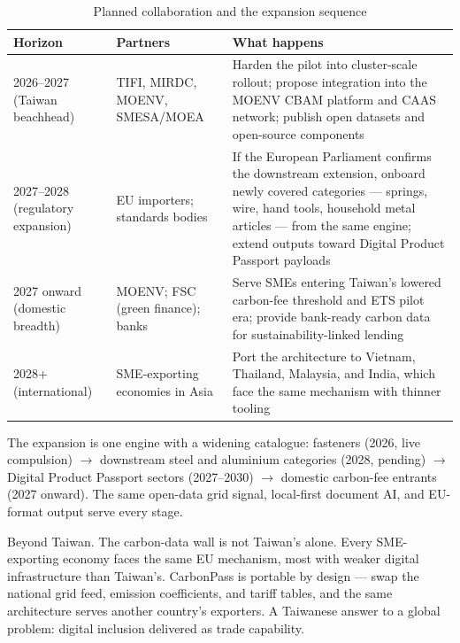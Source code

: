 \begin{table}[htbp]
\caption{Planned collaboration and the expansion sequence}
\label{tab:expansion}
\small
\begin{tabularx}{\textwidth}{@{}p{}p{}X@{}}
\toprule
\textbf{Horizon} & \textbf{Partners} & \textbf{What happens} \\
\midrule
2026--2027 (Taiwan beachhead) & TIFI, MIRDC, MOENV, SMESA/MOEA & Harden the pilot into cluster-scale rollout; propose integration into the MOENV CBAM platform and CAAS network; publish open datasets and open-source components\cite{tpt-cbam,caas} \\
2027--2028 (regulatory expansion) & EU importers; standards bodies & If the European Parliament confirms the downstream extension, onboard newly covered categories --- springs, wire, hand tools, household metal articles --- from the same engine\cite{akin}; extend outputs toward Digital Product Passport payloads\cite{espr} \\
2027 onward (domestic breadth) & MOENV; FSC (green finance); banks & Serve SMEs entering Taiwan's lowered carbon-fee threshold and ETS pilot era\cite{ecobiz}; provide bank-ready carbon data for sustainability-linked lending \\
2028+ (international) & SME-exporting economies in Asia & Port the architecture to Vietnam, Thailand, Malaysia, and India, which face the same mechanism with thinner tooling \\
\bottomrule
\end{tabularx}
\end{table}

The expansion is one engine with a widening catalogue: fasteners (2026, live
compulsion) $\to$ downstream steel and aluminium categories (2028, pending)
$\to$ Digital Product Passport sectors (2027--2030) $\to$ domestic carbon-fee
entrants (2027 onward). The same open-data grid signal, local-first document
AI, and EU-format output serve every stage.

\begin{spotlight}{Beyond Taiwan.}
The carbon-data wall is not Taiwan's alone. Every SME-exporting economy faces
the same EU mechanism, most with weaker digital infrastructure than Taiwan's.
CarbonPass is portable by design --- swap the national grid feed, emission
coefficients, and tariff tables, and the same architecture serves another
country's exporters. A Taiwanese answer to a global problem: digital inclusion
delivered as trade capability.
\end{spotlight}
